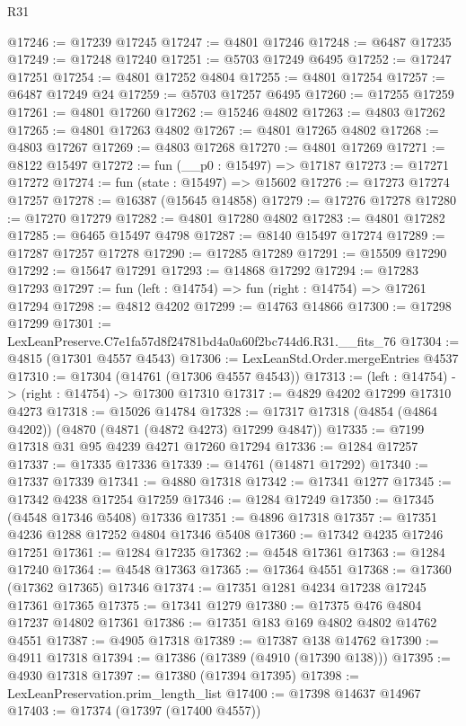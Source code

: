 \begin{lexlean}{R31}
\begin{coremodule}
@17246 := @17239 @17245
@17247 := @4801 @17246
@17248 := @6487 @17235
@17249 := @17248 @17240
@17251 := @5703 @17249 @6495
@17252 := @17247 @17251
@17254 := @4801 @17252 @4804
@17255 := @4801 @17254
@17257 := @6487 @17249 @24
@17259 := @5703 @17257 @6495
@17260 := @17255 @17259
@17261 := @4801 @17260
@17262 := @15246 @4802
@17263 := @4803 @17262
@17265 := @4801 @17263 @4802
@17267 := @4801 @17265 @4802
@17268 := @4803 @17267
@17269 := @4803 @17268
@17270 := @4801 @17269
@17271 := @8122 @15497
@17272 := fun (__p0 : @15497) => @17187
@17273 := @17271 @17272
@17274 := fun (state : @15497) => @15602
@17276 := @17273 @17274 @17257
@17278 := @16387 (@15645 @14858)
@17279 := @17276 @17278
@17280 := @17270 @17279
@17282 := @4801 @17280 @4802
@17283 := @4801 @17282
@17285 := @6465 @15497 @4798
@17287 := @8140 @15497 @17274
@17289 := @17287 @17257 @17278
@17290 := @17285 @17289
@17291 := @15509 @17290
@17292 := @15647 @17291
@17293 := @14868 @17292
@17294 := @17283 @17293
@17297 := fun (left : @14754) => fun (right : @14754) => @17261 @17294
@17298 := @4812 @4202
@17299 := @14763 @14866
@17300 := @17298 @17299
@17301 := LexLeanPreserve.C7e1fa57d8f24781bd4a0a60f2bc744d6.R31.__fits_76
@17304 := @4815 (@17301 @4557 @4543)
@17306 := LexLeanStd.Order.mergeEntries @4537
@17310 := @17304 (@14761 (@17306 @4557 @4543))
@17313 := (left : @14754) -> (right : @14754) -> @17300 @17310
@17317 := @4829 @4202 @17299 @17310 @4273
@17318 := @15026 @14784
@17328 := @17317 @17318 (@4854 (@4864 @4202)) (@4870 (@4871 (@4872 @4273) @17299 @4847))
@17335 := @7199 @17318 @31 @95 @4239 @4271 @17260 @17294
@17336 := @1284 @17257
@17337 := @17335 @17336
@17339 := @14761 (@14871 @17292)
@17340 := @17337 @17339
@17341 := @4880 @17318
@17342 := @17341 @1277
@17345 := @17342 @4238 @17254 @17259
@17346 := @1284 @17249
@17350 := @17345 (@4548 @17346 @5408) @17336
@17351 := @4896 @17318
@17357 := @17351 @4236 @1288 @17252 @4804 @17346 @5408
@17360 := @17342 @4235 @17246 @17251
@17361 := @1284 @17235
@17362 := @4548 @17361
@17363 := @1284 @17240
@17364 := @4548 @17363
@17365 := @17364 @4551
@17368 := @17360 (@17362 @17365) @17346
@17374 := @17351 @1281 @4234 @17238 @17245 @17361 @17365
@17375 := @17341 @1279
@17380 := @17375 @476 @4804 @17237 @14802 @17361
@17386 := @17351 @183 @169 @4802 @4802 @14762 @4551
@17387 := @4905 @17318
@17389 := @17387 @138 @14762
@17390 := @4911 @17318
@17394 := @17386 (@17389 (@4910 (@17390 @138)))
@17395 := @4930 @17318
@17397 := @17380 (@17394 @17395)
@17398 := LexLeanPreservation.prim_length_list
@17400 := @17398 @14637 @14967
@17403 := @17374 (@17397 (@17400 @4557))

\end{coremodule}
\end{lexlean}

